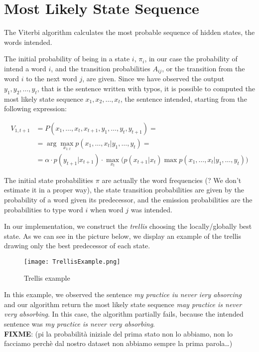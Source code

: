 \section{Most Likely State Sequence}

The Viterbi algorithm calculates the most probable sequence of hidden states, the words intended.

The initial probability of being in a state $i$, $\pi_i$, in our case the probability of intend a word $i$, and the 
transition probabilities $A_{ij}$, or the transition from the word $i$ to the next word $j$, are given. Since we have 
observed the output $y_1, y_2, \dots , y_t$, that is the sentence written with typos, it is possible to computed the most 
likely state sequence $x_1, x_2, \dots , x_t$, the sentence intended, starting from the following expression:

\begin{equation}
	\begin{aligned}
		V_{1,t+1} &= P(x_1, \dots, x_t, x_{t+1}, y_1, \dots, y_t,  y_{t+1}) = \\
						&= \arg\max_{x_{1:t}} p(x_1, \dots, x_t | y_1, \dots, y_t) = \\
						& =  \alpha \cdot p(y_{t+1}|x_{t+1})\cdot\max_{x_t} \Big( p(x_{t+1}|x_t) \max p(x_1, \dots, x_{t}|y_1, 
						\dots, y_t)\Big)
	\end{aligned}
\end{equation}

The initial state probabilities $\pi$ are actually the word frequencies (? We don’t estimate it in a proper way), the state 
transition probabilities are given by the probability of a word given its predecessor, and the emission probabilities are the 
probabilities to type word $i$ when word $j$ was intended.

In our implementation, we construct the \textit{trellis} choosing the locally/globally best state. As we can see in the 
picture below, we display an example of the trellis drawing only the best predecessor of each state.

\begin{figure}[H]
	\centering
	\texttt{[image: TrellisExample.png]}
	\caption{Trellis example}
	\label{fig:trellis}
\end{figure}

In this example, we observed the sentence \textsl{my practice iu never iery absorcing} and our algorithm return the most 
likely state sequence \textsl{may practice is never very absorbing}. In this case, the algorithm partially fails, because the 
intended sentence was \textsl{my practice is never very absorbing}.
\\
\textbf{FIXME}: (pi la probabilità iniziale del prima stato non lo abbiamo, non lo facciamo perchè dal nostro dataset non 
abbiamo sempre la prima parola…)

